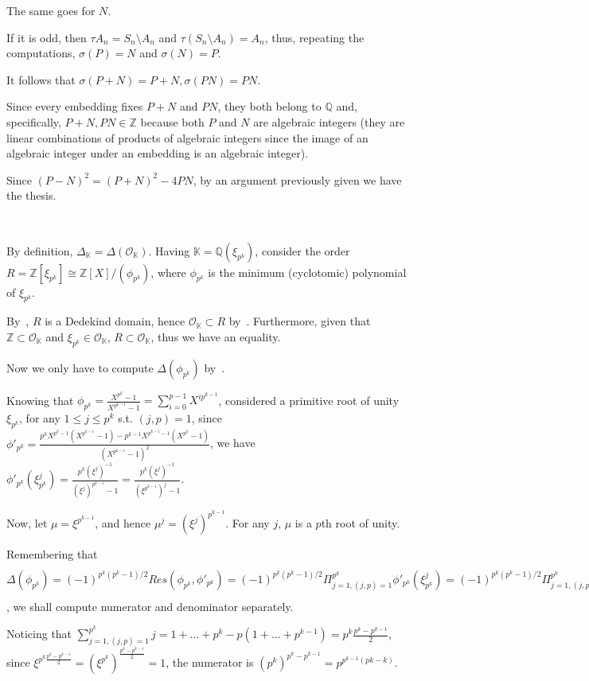 \documentclass{article}
\newcommand{\numberset}{\mathbb}
\newcommand{\Z}{\numberset{Z}}
\newcommand{\Q}{\numberset{Q}}
\newcommand{\K}{\numberset{K}}
\newcommand{\exercise}[1]{\noindent {\bf Exercise #1}}
\begin{document}
The same goes for $N$.

If it is odd, then $\tau A_n=S_n\setminus A_n$ and $\tau(S_n\setminus A_n)=A_n$, thus, repeating the computations, $\sigma(P)=N$ and $\sigma(N)=P$.

It follows that $\sigma(P+N)=P+N,\sigma(PN)=PN$.

Since every embedding fixes $P+N$ and $PN$, they both belong to $\Q$ and, specifically, $P+N,PN\in\Z$ because both $P$ and $N$ are algebraic integers (they are linear combinations of products of algebraic integers since the image of an algebraic integer under an embedding is an algebraic integer).

Since $(P-N)^2=(P+N)^2-4PN$, by an argument previously given we have the thesis.


~\\
\exercise{17}

By definition, $\Delta_{\K}=\Delta(\mathcal{O}_{\K})$. Having $\K=\Q(\xi_{p^k})$, consider the order $R=\Z[\xi_{p^k}]\cong\Z[X]/(\phi_{p^k})$, where $\phi_{p^k}$ is the minimum (cyclotomic) polynomial of $\xi_{p^k}$.

By~\cite[thm. 3.12]{stev}, $R$ is a Dedekind domain, hence $\mathcal{O}_{\K}\subset R$ by~\cite[thm. 3.20(3)]{stev}. Furthermore, given that $\Z\subset\mathcal{O}_{\K}$ and $\xi_{p^k}\in\mathcal{O}_{\K}$, $R\subset\mathcal{O}_{\K}$, thus we have an equality.

Now we only have to compute $\Delta(\phi_{p^k})$ by~\cite[cor. 4.7]{stev}.

Knowing that $\phi_{p^k}=\frac{X^{p^k}-1}{X^{p^{k-1}}-1}=\sum_{i=0}^{p-1}X^{ip^{k-1}}$, considered a primitive root of unity $\xi_{p^k}$, for any $1\leq j\leq p^k$ s.t. $(j,p)=1$, since $\phi'_{p^k}=\frac{p^kX^{p^k-1}(X^{p^{k-1}}-1)-p^{k-1}X^{p^{k-1}-1}(X^{p^k}-1)}{(X^{p^{k-1}}-1)^2}$, we have $\phi'_{p^k}(\xi^j_{p^k})=\frac{p^k(\xi^j)^{-1}}{(\xi^j)^{p^{k-1}}-1}=\frac{p^k(\xi^j)^{-1}}{(\xi^{p^{k-1}})^j-1}$.

Now, let $\mu=\xi^{p^{k-1}}$, and hence $\mu^j=(\xi^j)^{p^{k-1}}$. For any $j$, $\mu$ is a $p$th root of unity.

Remembering that $\Delta(\phi_{p^k})=(-1)^{p^k(p^k-1)/2}Res(\phi_{p^k},\phi'_{p^k})=(-1)^{p^k(p^k-1)/2}\Pi_{j=1,(j,p)=1}^{p^k}\phi'_{p^k}(\xi^j_{p^k})=(-1)^{p^k(p^k-1)/2}\Pi_{j=1,(j,p)=1}^{p^k}\frac{p^k(\xi^j)^{-1}}{(\xi^{p^{k-1}})^j-1}$, we shall compute numerator and denominator separately.

Noticing that $\sum_{j=1,(j,p)=1}^{p^k} j=1+\ldots+p^k-p(1+\ldots+p^{k-1})=p^k\frac{p^k-p^{k-1}}{2}$, since $\xi^{p^k\frac{p^k-p^{k-1}}{2}}=(\xi^{p^k})^\frac{p^k-p^{k-1}}{2}=1$, the numerator is $(p^k)^{p^k-p^{k-1}}=p^{p^{k-1}(pk-k)}$.
\end{document}

